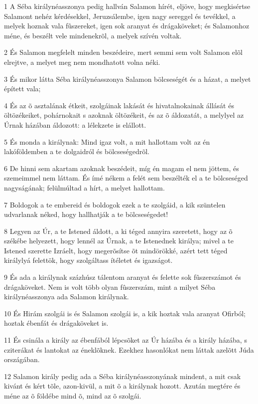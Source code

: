 \par 1 A Séba királynéasszonya pedig hallván Salamon hírét, eljöve, hogy megkisértse Salamont nehéz kérdésekkel, Jeruzsálembe, igen nagy sereggel és tevékkel, a melyek hoznak vala fûszereket, igen sok aranyat és drágaköveket; és Salamonhoz méne, és beszélt vele mindenekrõl, a melyek szívén voltak.
\par 2 És Salamon megfelelt minden beszédeire, mert semmi sem volt Salamon elõl elrejtve, a melyet meg nem mondhatott volna néki.
\par 3 És mikor látta Séba királynéasszonya Salamon bölcseségét és a házat, a melyet épített vala;
\par 4 És az õ asztalának étkeit, szolgáinak lakását és hivatalnokainak állását és öltözékeiket, pohárnokait s azoknak öltözékeit, és az õ áldozatát, a melylyel az Úrnak házában áldozott: a lélekzete is elállott.
\par 5 És monda a királynak: Mind igaz volt, a mit hallottam volt az én lakóföldemben a te dolgaidról és bölcseségedrõl.
\par 6 De hinni sem akartam azoknak beszédeit, míg én magam el nem jöttem, és szemeimmel nem láttam. És ímé nékem a felét sem beszélték el a te bölcseséged nagyságának; felülmúltad a hírt, a melyet hallottam.
\par 7 Boldogok a te embereid és boldogok ezek a te szolgáid, a kik szüntelen udvarlanak néked, hogy hallhatják a te bölcseségedet!
\par 8 Legyen az Úr, a te Istened áldott, a ki téged annyira szeretett, hogy az õ székébe helyezett, hogy lennél az Úrnak, a te Istenednek királya; mivel a te Istened szerette Izráelt, hogy megerõsítse õt mindörökké, azért tett téged királylyá felettök, hogy szolgáltass ítéletet és igazságot.
\par 9 És ada a királynak százhúsz tálentom aranyat és felette sok fûszerszámot és drágaköveket. Nem is volt több olyan fûszerszám, mint a milyet Séba királynéasszonya ada Salamon királynak.
\par 10 És Hirám szolgái is és Salamon szolgái is, a kik hoztak vala aranyat Ofirból; hoztak ébenfát és drágaköveket is.
\par 11 És csinála a király az ébenfából lépcsõket az Úr házába és a király házába, s cziterákat és lantokat az éneklõknek. Ezekhez hasonlókat nem láttak azelõtt Júda országában.
\par 12 Salamon király pedig ada a Séba királynéasszonyának mindent, a mit csak kivánt és kért tõle, azon-kivül, a mit õ a királynak hozott. Azután megtére és méne az õ földébe mind õ, mind az õ szolgái.

